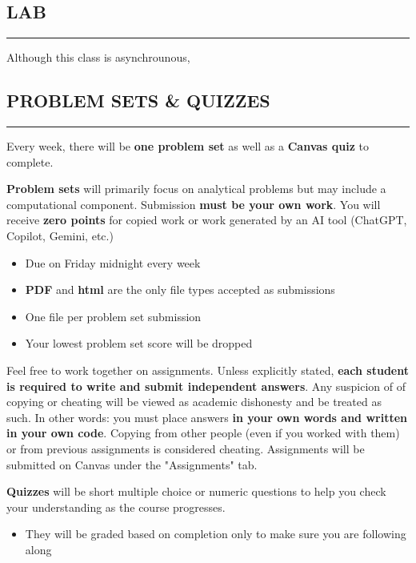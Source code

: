 \subsection*{LAB}
\vspace*{-0.5cm}
\rule{\textwidth}{2pt}

Although this class is asynchrounous, 

\subsection*{PROBLEM SETS \& QUIZZES}
\vspace*{-0.5cm}
\rule{\textwidth}{2pt}

Every week, there will be \textbf{one problem set} as well as a \textbf{Canvas quiz} to complete.

\textbf{Problem sets} will primarily focus on analytical problems but may include a computational component. 
Submission \textbf{must be your own work}.
You will receive \textbf{zero points} for copied work or work generated by an AI tool (ChatGPT, Copilot, Gemini, etc.)

\begin{itemize}
    \item Due on Friday midnight every week
    \item \textbf{PDF} and \textbf{html} are the only file types accepted as submissions
    \item One file per problem set submission
    \item Your lowest problem set score will be dropped
\end{itemize}

Feel free to work together on assignments.
Unless explicitly stated, \textbf{each student is required to write and submit independent answers}.
Any suspicion of of copying or cheating will be viewed as academic dishonesty and be treated as such. 
In other words: you must place answers \textbf{in your own words and written in your own code}.
Copying from other people (even if you worked with them) or from previous assignments is considered cheating. 
Assignments will be submitted on Canvas under the "Assignments" tab. 

\textbf{Quizzes} will be short multiple choice or numeric questions to help you check your understanding as the course progresses. 
\begin{itemize}
    \item They will be graded based on completion only to make sure you are following along
\end{itemize}

